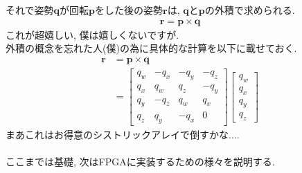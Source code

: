 \documentclass[a4j]{jsarticle}
\begin{document}
それで姿勢$\bm{q}$が回転$\bm{p}$をした後の姿勢$\bm{r}$は, $\bm{q}$と$\bm{p}$の外積で求められる.
\begin{align}
    \bm{r} = \bm{p} \times \bm{q} \nonumber 
\end{align}
これが超嬉しい, 僕は嬉しくないですが. \\
外積の概念を忘れた人(僕)の為に具体的な計算を以下に載せておく.
\begin{align}
    \bm{r} &= \bm{p} \times \bm{q} \nonumber \\
           &= 
           \left[
                \begin{array}{cccc}
                    q_w & -q_x & -q_y & -q_z \\
                    q_x & q_w  & q_z  & -q_y \\
                    q_y & -q_z  & q_w & q_x \\
                    q_z & q_y  & -q_x & 0
                \end{array}
           \right]
           \left[
                \begin{array}{c}
                    q_w \\
                    q_x \\
                    q_y \\
                    q_z 
                \end{array}
           \right] \nonumber
\end{align}
まあこれはお得意のシストリックアレイで倒すかな.... \\ \\
ここまでは基礎, 次はFPGAに実装するための様々を説明する.
\end{document}
